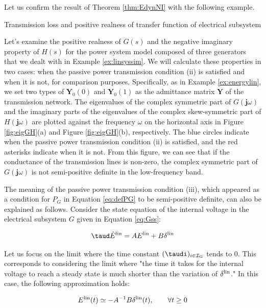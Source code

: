 \documentclass[graybox, envcountchap]{svmult}
\begin{document}
Let us confirm the result of Theorem \ref{thm:EdynNI} with the following
example.

\begin{example}{Transmission loss and positive realness of transfer function of
electrical subsystem}

Let's examine the positive realness of $G(s)$ and the negative imaginary
property of $H(s)$ for the power system model composed of three generators that
we dealt with in Example \ref{ex:linsyssim}. We will calculate these properties
in two cases: when the passive power transmission condition (ii) is satisfied
and when it is not, for comparison purposes. Specifically, as in Example
\ref{ex:energylin}, we set two types of $\bm{Y}_0(0)$ and $\bm{Y}_0(1)$ as the
admittance matrix $\bm{Y}$ of the transmission network. The eigenvalues of the
complex symmetric part of $G(\bm{j}\omega)$ and the imaginary parts of the
eigenvalues of the complex skew-symmetric part of $H(\bm{j}\omega)$ are plotted
against the frequency $\omega$ on the horizontal axis in Figure
\ref{fig:eigGH}(a) and Figure \ref{fig:eigGH}(b), respectively. The blue circles
indicate when the passive power transmission condition (ii) is satisfied, and
the red asterisks indicate when it is not. From this figure, we can see that if
the conductance of the transmission lines is non-zero, the complex symmetric
part of $G(\bm{j}\omega)$ is not semi-positive definite in the low-frequency
band.  \end{example}

The meaning of the passive power transmission condition (iii), which appeared as
a condition for $P_G$ in Equation \ref{eq:defPG} to be semi-positive definite,
can also be explained as follows. Consider the state equation of the internal
voltage in the electrical subsystem $G$ given in Equation \ref{eq:Gss}:

\begin{equation*}
  \taud
  \dot{E}^{\rm lin} = 
  A E^{\rm lin} + B \delta^{\rm lin}
\end{equation*}

Let us focus on the limit where the time constant $( \taudi )_{i \in
\mathcal{I}_{\rm G}}$ tends to 0. This corresponds to considering the limit where
"the time it takes for the internal voltage to reach a steady state is much
shorter than the variation of $\delta^{\rm lin}$." In this case, the following
approximation holds:

\begin{equation}\label{eq:spa}
  E^{\rm lin}(t) \simeq  -A^{-1} B\delta^{\rm lin}(t)
  ,\qquad
  \forall t\geq 0
\end{equation}
\end{document}
